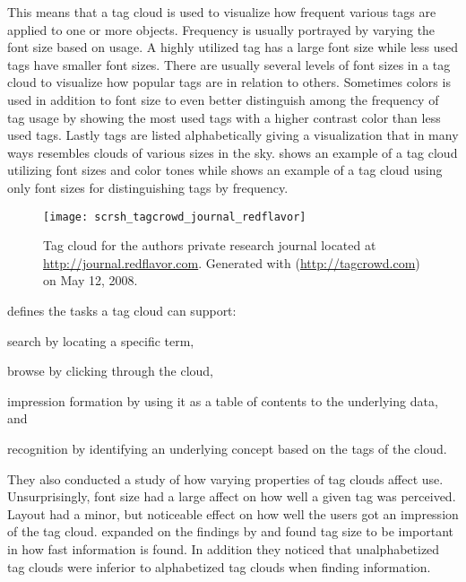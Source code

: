 This means that a tag cloud is used to visualize how frequent various tags
are applied to one or more objects. Frequency is usually portrayed by varying
the font size based on usage. A highly utilized tag has a large font size
while less used tags have smaller font sizes. There are usually several levels
of font sizes in a tag cloud to visualize how popular tags are in relation to
others. Sometimes colors is used in addition to font size to even better
distinguish among the frequency of tag usage by showing the most used tags
with a higher contrast color than less used tags. Lastly tags are listed
alphabetically giving a visualization that in many ways resembles clouds of
various sizes in the sky.
shows an example of a tag cloud utilizing font sizes and color tones while
 shows an example of a tag cloud using
only font sizes for distinguishing tags by frequency.

\begin{figure}
  \texttt{[image: scrsh\_tagcrowd\_journal\_redflavor]}
  \caption[Research Journal Tag Cloud]{
    Tag cloud for the authors private research journal located
    at \url{http://journal.redflavor.com}. Generated with
     (\url{http://tagcrowd.com}) on May 12, 2008.
  }
  \label{figure:scrsh.tagcrowd.journal.redflavor}
\end{figure}

\citet[]{rivadeneira07} defines the tasks a tag cloud can support:
  \begin{inparaenum}[(i)]
    \item search by locating a specific term,
    \item browse by clicking through the cloud,
    \item impression formation by using it as a table of contents
      to the underlying data, and
    \item recognition by identifying an underlying concept based on
      the tags of the cloud.
  \end{inparaenum}
They also conducted a study of how varying properties of tag clouds affect
use. Unsurprisingly, font size had a large affect on how well a
given tag was perceived. Layout had a minor, but noticeable effect on
how well the users got an impression of the tag cloud.
\citet[]{halvey07} expanded on the findings by
\citeauthor{rivadeneira07} and found tag size to be important in how
fast information is found. In addition they noticed that unalphabetized
tag clouds were inferior to alphabetized tag clouds when finding information.

